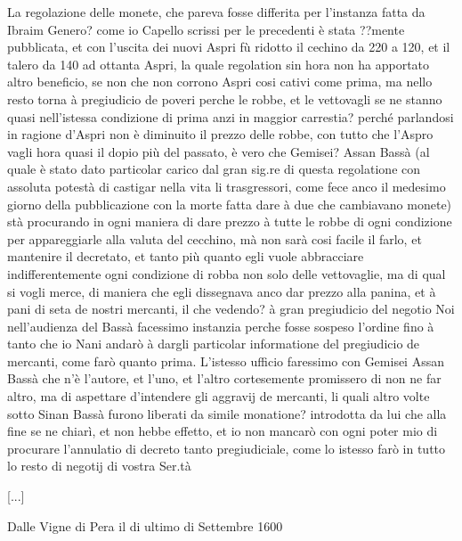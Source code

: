La regolazione delle monete, che pareva fosse differita per l'instanza
fatta da  Ibraim Genero? come io  Capello scrissi per  le precedenti è
stata ??mente pubblicata,  et con l'uscita dei nuovi  Aspri fù ridotto
il cechino  da 220 a  120, et  il talero da  140 ad ottanta  Aspri, la
quale regolation sin hora non ha apportato altro beneficio, se non che
non  corrono Aspri  cosi cativi  come prima,  ma nello  resto  torna à
pregiudicio de poveri  perche le robbe, et le  vettovagli se ne stanno
quasi  nell'istessa condizione  di  prima anzi  in maggior  carrestia?
perché parlandosi in  ragione d'Aspri non è diminuito  il prezzo delle
robbe,  con  tutto che  l'Aspro  vagli hora  quasi  il  dopio più  del
passato,  è vero  che  Gemisei? Assan  Bassà  (al quale  è stato  dato
particolar carico  dal gran sig.re di questa  regolatione con assoluta
potestà  di castigar  nella vita  li trasgressori,  come fece  anco il
medesimo giorno della pubblicazione con  la morte fatta dare à due che
cambiavano monete)  stà procurando  in ogni maniera  di dare  prezzo à
tutte le  robbe di ogni  condizione per appareggiarle alla  valuta del
cecchino, mà non sarà cosi facile il farlo, et mantenire il decretato,
et  tanto più  quanto  egli vuole  abbracciare indifferentemente  ogni
condizione di  robba non solo delle  vettovaglie, ma di  qual si vogli
merce, di maniera che egli  dissegnava anco dar prezzo alla panina, et
à pani di seta de nostri  mercanti, il che vedendo? à gran pregiudicio
del  negotio Noi  nell'audienza del  Bassà facessimo  instanzia perche
fosse  sospeso l'ordine  fino  à tanto  che  io Nani  andarò à  dargli
particolar informatione del pregiudicio  de mercanti, come farò quanto
prima.  L'istesso ufficio faressimo  con Gemisei  Assan Bassà  che n'è
l'autore, et l'uno,  et l'altro cortesemente promissero di  non ne far
altro, ma di aspettare d'intendere  gli aggravij de mercanti, li quali
altro  volte sotto Sinan  Bassà furono  liberati da  simile monatione?
introdotta da lui che alla fine se ne chiarì, et non hebbe effetto, et
io non mancarò con ogni  poter mio di procurare l'annulatio di decreto
tanto pregiudiciale, come lo istesso farò in tutto lo resto di negotij
di vostra Ser.tà

[...]

Dalle Vigne di Pera il di ultimo di Settembre 1600



\newpage


